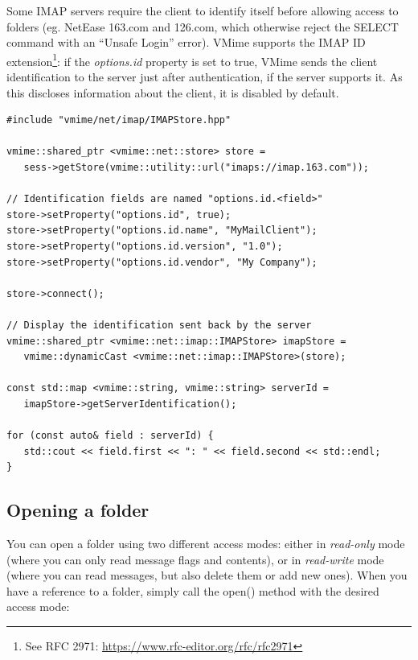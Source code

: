 
Some IMAP servers require the client to identify itself before allowing
access to folders (eg. NetEase 163.com and 126.com, which otherwise reject the
{\vcode SELECT} command with an ``Unsafe Login'' error). VMime supports the
IMAP ID extension\footnote{See RFC 2971: \url{https://www.rfc-editor.org/rfc/rfc2971}}:
if the \emph{options.id} property is set to {\vcode true}, VMime sends the
client identification to the server just after authentication, if the server
supports it. As this discloses information about the client, it is disabled
by default.

\begin{lstlisting}[caption={Sending client identification to an IMAP server}]
#include "vmime/net/imap/IMAPStore.hpp"

vmime::shared_ptr <vmime::net::store> store =
   sess->getStore(vmime::utility::url("imaps://imap.163.com"));

// Identification fields are named "options.id.<field>"
store->setProperty("options.id", true);
store->setProperty("options.id.name", "MyMailClient");
store->setProperty("options.id.version", "1.0");
store->setProperty("options.id.vendor", "My Company");

store->connect();

// Display the identification sent back by the server
vmime::shared_ptr <vmime::net::imap::IMAPStore> imapStore =
   vmime::dynamicCast <vmime::net::imap::IMAPStore>(store);

const std::map <vmime::string, vmime::string> serverId =
   imapStore->getServerIdentification();

for (const auto& field : serverId) {
   std::cout << field.first << ": " << field.second << std::endl;
}
\end{lstlisting}

\subsection{Opening a folder} %

You can open a folder using two different access modes: either in
\emph{read-only} mode (where you can only read message flags and contents), or
in \emph{read-write} mode (where you can read messages, but also delete them
or add new ones). When you have a reference to a folder, simply call the
{\vcode open()} method with the desired access mode:

